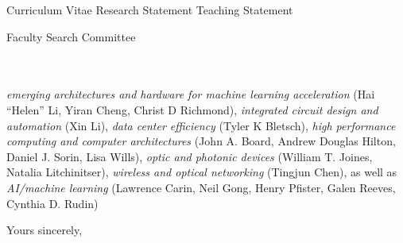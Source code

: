 



\addAttach%
{Curriculum Vitae}%
{Research Statement}%
{Teaching Statement}
\def\appSpecific{with significant implications for the broad area of computer engineering}
\def\letterCustom{%
    \emph{emerging architectures and hardware for machine learning acceleration} (Hai ``Helen'' Li, Yiran Cheng, Christ D Richmond), \emph{integrated circuit design and automation} (Xin Li), \emph{data center efficiency} (Tyler K Bletsch), \emph{high performance computing and computer architectures} (John A. Board, Andrew Douglas Hilton, Daniel J. Sorin, Lisa Wills), \emph{optic and photonic devices} (William T. Joines, Natalia Litchinitser), \emph{wireless and optical networking} (Tingjun Chen), as well as \emph{AI/machine learning} (Lawrence Carin, Neil Gong, Henry Pfister, Galen Reeves, Cynthia D. Rudin)%
}

\def\appJobID{%
    \ifthenelse{\equal{\jobID}{}}{\unskip}{\unskip\textemdash Job \# \jobID{}}%
}
\def\toAddr{%
Faculty Search Committee \\ \appDept{} \\ \appSchool{} \\ \appAddr{}%
}

\begin{letter}{\toAddr{}}
    \opening{\myOpening{}}
    
    \letterCustom{}%
    
    \closing{Yours sincerely,}
    \encl{\listAttach{}}
\end{letter}

